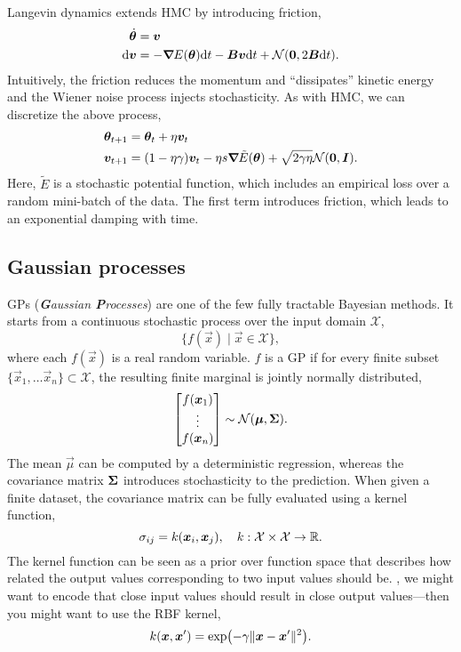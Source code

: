Langevin dynamics extends HMC by introducing friction,
\begin{align*}
    \dot{\bm{\theta}} & = \bm{v}                                                                                                             \\
    \mathrm{d}\bm{v}  & = - \bm{\nabla}_{\! } E(\bm{\theta}) \mathrm{d}t - \bm{B} \bm{v} \mathrm{d}t + \mathcal{N}(\bm{0}, 2 \bm{B} \mathrm{d}t).
\end{align*}
Intuitively, the friction reduces the momentum and ``dissipates'' kinetic energy and the Wiener noise
process injects stochasticity. As with HMC, we can discretize the above process,
\begin{align*}
    \bm{\theta}_{t+1} & = \bm{\theta}_t + \eta \bm{v}_t                                                                                           \\
    \bm{v}_{t+1}      & = (1-\eta \gamma) \bm{v}_t - \eta s \bm{\nabla}_{\! } \tilde{E}(\bm{\theta}) + \sqrt{2 \gamma \eta} \mathcal{N}(\bm{0}, \bm{I}).
\end{align*}
Here, $\tilde{E}$ is a stochastic potential function, which includes an empirical loss over a random
mini-batch of the data. The first term introduces friction, which leads to an exponential damping
with time.

\subsection{Gaussian processes}

GPs (\textit{\textbf{G}aussian \textbf{P}rocesses}) are one of the few fully tractable Bayesian
methods. It starts from a continuous stochastic process over the input domain $\mathcal{X}$, \[
    \{ f(\vec{x}) \mid \vec{x} \in \mathcal{X} \},
\]
where each $f(\vec{x})$ is a real random variable. $f$ is a GP if for every finite subset $\{
    \vec{x}_1, \ldots \vec{x}_n \} \subset \mathcal{X}$, the resulting finite marginal is jointly
normally distributed, \[
    \begin{bmatrix} f(\bm{x}_1) \\ \vdots \\ f(\bm{x}_n) \end{bmatrix} \sim \mathcal{N}(\bm{\mu}, \bm{\Sigma}).
\]
The mean $\vec{\mu}$ can be computed by a deterministic regression, whereas the covariance matrix
$\bm{\Sigma}$ introduces stochasticity to the prediction. When given a finite dataset, the
covariance matrix can be fully evaluated using a kernel function, \[
    \sigma_{ij} = k(\bm{x}_i, \bm{x}_j), \quad k: \mathcal{X} \times \mathcal{X} \to \mathbb{R}.
\]
The kernel function can be seen as a prior over function space that describes how related the
output values corresponding to two input values should be. \Eg, we might want to encode that close
input values should result in close output values---then you might want to use the RBF kernel, \[
    k(\vec{x}, \vec{x}') = \exp \lft( -\gamma \| \vec{x} - \vec{x}' \|^2 \rgt).
\]

